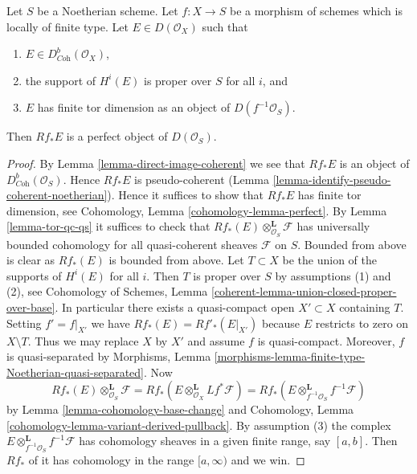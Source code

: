 \begin{lemma}
\label{lemma-perfect-direct-image}
Let $S$ be a Noetherian scheme. Let $f : X \to S$ be a morphism of schemes
which is locally of finite type. Let $E \in D(\mathcal{O}_X)$ such that
\begin{enumerate}
\item $E \in D^b_{\textit{Coh}}(\mathcal{O}_X)$,
\item the support of $H^i(E)$ is proper over $S$ for all $i$, and
\item $E$ has finite tor dimension as an object of $D(f^{-1}\mathcal{O}_S)$.
\end{enumerate}
Then $Rf_*E$ is a perfect object of $D(\mathcal{O}_S)$.
\end{lemma}

\begin{proof}
By Lemma \ref{lemma-direct-image-coherent} we see that $Rf_*E$ is an object of
$D^b_{\textit{Coh}}(\mathcal{O}_S)$. Hence $Rf_*E$ is pseudo-coherent
(Lemma \ref{lemma-identify-pseudo-coherent-noetherian}).
Hence it suffices to show that $Rf_*E$ has finite tor dimension, see
Cohomology, Lemma \ref{cohomology-lemma-perfect}.
By Lemma \ref{lemma-tor-qc-qs} it suffices to check that
$Rf_*(E) \otimes_{\mathcal{O}_S}^\mathbf{L} \mathcal{F}$
has universally bounded cohomology for all quasi-coherent
sheaves $\mathcal{F}$ on $S$. Bounded from above is clear as $Rf_*(E)$
is bounded from above. Let $T \subset X$ be the union of the supports
of $H^i(E)$ for all $i$. Then $T$ is proper over $S$ by assumptions
(1) and (2), see Cohomology of Schemes, Lemma
\ref{coherent-lemma-union-closed-proper-over-base}.
In particular there exists a quasi-compact open
$X' \subset X$ containing $T$. Setting $f' = f|_{X'}$ we have
$Rf_*(E) = Rf'_*(E|_{X'})$ because $E$ restricts to zero on $X \setminus T$.
Thus we may replace $X$ by $X'$ and assume $f$ is quasi-compact.
Moreover, $f$ is quasi-separated by Morphisms, Lemma
\ref{morphisms-lemma-finite-type-Noetherian-quasi-separated}. Now
$$
Rf_*(E) \otimes_{\mathcal{O}_S}^\mathbf{L} \mathcal{F} =
Rf_*\left(E \otimes_{\mathcal{O}_X}^\mathbf{L} Lf^*\mathcal{F}\right) =
Rf_*\left(E \otimes_{f^{-1}\mathcal{O}_S}^\mathbf{L} f^{-1}\mathcal{F}\right)
$$
by
Lemma \ref{lemma-cohomology-base-change}
and
Cohomology, Lemma \ref{cohomology-lemma-variant-derived-pullback}.
By assumption (3) the complex
$E \otimes_{f^{-1}\mathcal{O}_S}^\mathbf{L} f^{-1}\mathcal{F}$
has cohomology sheaves in a
given finite range, say $[a, b]$. Then $Rf_*$ of it
has cohomology in the range $[a, \infty)$ and we win.
\end{proof}
